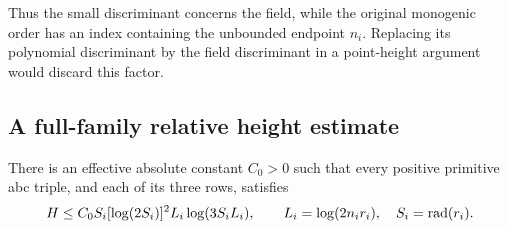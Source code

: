 Thus the small discriminant concerns the field, while the original
monogenic order has an index containing the unbounded endpoint $n_i$.
Replacing its polynomial discriminant by the field discriminant in a
point-height argument would discard this factor.

\subsection{A full-family relative height estimate}

\begin{theorem}\label{thm:relative-cubic-height}
There is an effective absolute constant $C_0>0$ such that every positive
primitive abc triple, and each of its three rows, satisfies
\begin{equation}\label{eq:relative-cubic-height}
 H\le C_0 S_i[\log(2S_i)]^2 L_i\log(3S_iL_i),
 \qquad L_i=\log(2n_i r_i),\quad S_i=\operatorname{rad}(r_i).
\end{equation}
\end{theorem}
